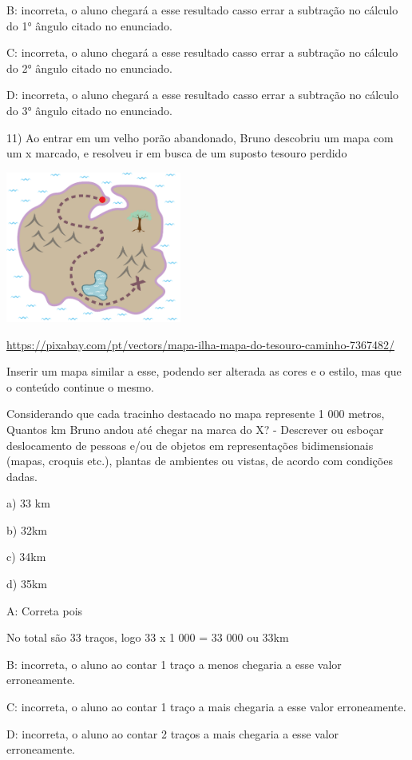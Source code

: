 B: incorreta, o aluno chegará a esse resultado casso errar a subtração
no cálculo do 1° ângulo citado no enunciado.

C: incorreta, o aluno chegará a esse resultado casso errar a subtração
no cálculo do 2° ângulo citado no enunciado.

D: incorreta, o aluno chegará a esse resultado casso errar a subtração
no cálculo do 3° ângulo citado no enunciado.

11) Ao entrar em um velho porão abandonado, Bruno descobriu um mapa com
um x marcado, e resolveu ir em busca de um suposto tesouro perdido

\includegraphics[width=2.27099in,height=1.95in]{./imgSAEB_8_MAT/media/image61.png}

\url{https://pixabay.com/pt/vectors/mapa-ilha-mapa-do-tesouro-caminho-7367482/}

Inserir um mapa similar a esse, podendo ser alterada as cores e o
estilo, mas que o conteúdo continue o mesmo.

Considerando que cada tracinho destacado no mapa represente 1 000
metros, Quantos km Bruno andou até chegar na marca do X? - Descrever ou
esboçar deslocamento de pessoas e/ou de objetos em representações
bidimensionais (mapas, croquis etc.), plantas de ambientes ou vistas, de
acordo com condições dadas.

a) 33 km

b) 32km

c) 34km

d) 35km

A: Correta pois

No total são 33 traços, logo 33 x 1 000 = 33 000 ou 33km

B: incorreta, o aluno ao contar 1 traço a menos chegaria a esse valor
erroneamente.

C: incorreta, o aluno ao contar 1 traço a mais chegaria a esse valor
erroneamente.

D: incorreta, o aluno ao contar 2 traços a mais chegaria a esse valor
erroneamente.

